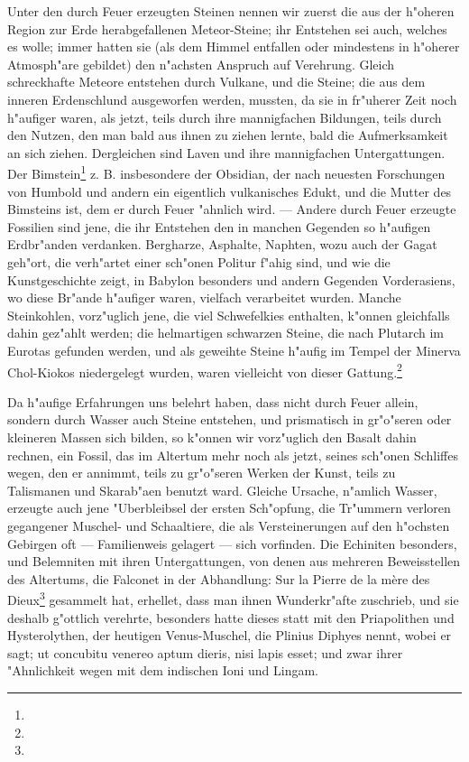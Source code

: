 \documentclass[a4paper, 11pt, oneside, polutonikogreek, german]{article}
\begin{document}
Unter den durch Feuer erzeugten Steinen nennen wir zuerst die aus der h"oheren Region zur Erde herabgefallenen Meteor-Steine; ihr Entstehen sei auch, welches es wolle; immer hatten sie (als dem Himmel entfallen oder mindestens in h"oherer Atmosph"are gebildet) den n"achsten Anspruch auf Verehrung. Gleich schreckhafte Meteore entstehen durch Vulkane, und die Steine; die aus dem inneren Erdenschlund ausgeworfen werden, mussten, da sie in fr"uherer Zeit noch h"aufiger waren, als jetzt, teils durch ihre mannigfachen Bildungen, teils durch den Nutzen, den man bald aus ihnen zu ziehen lernte, bald die Aufmerksamkeit an sich ziehen. Dergleichen sind Laven und ihre mannigfachen Untergattungen. Der Bimstein\footnote{} z. B. insbesondere der Obsidian, der nach neuesten Forschungen von Humbold und andern ein eigentlich vulkanisches Edukt, und die Mutter des Bimsteins ist, dem er durch Feuer "ahnlich wird. --- Andere durch Feuer erzeugte Fossilien sind jene, die ihr Entstehen den in manchen Gegenden so h"aufigen Erdbr"anden verdanken. Bergharze, Asphalte, Naphten, wozu auch der Gagat geh"ort, die verh"artet einer sch"onen Politur f"ahig sind, und wie die Kunstgeschichte zeigt, in Babylon besonders und andern Gegenden Vorderasiens, wo diese Br"ande h"aufiger waren, vielfach verarbeitet wurden. Manche Steinkohlen, vorz"uglich jene, die viel Schwefelkies enthalten, k"onnen gleichfalls dahin gez"ahlt werden; die helmartigen schwarzen Steine, die nach Plutarch im Eurotas gefunden werden, und als geweihte Steine h"aufig im Tempel der Minerva Chol-Kiokos niedergelegt wurden, waren vielleicht von dieser Gattung.\footnote{}

Da h"aufige Erfahrungen uns belehrt haben, dass nicht durch Feuer allein, sondern durch Wasser auch Steine entstehen, und prismatisch in gr"o"seren oder kleineren Massen sich bilden, so k"onnen wir vorz"uglich den Basalt dahin rechnen, ein Fossil, das im Altertum mehr noch als jetzt, seines sch"onen Schliffes wegen, den er annimmt, teils zu gr"o"seren Werken der Kunst, teils zu Talismanen und Skarab"aen benutzt ward. Gleiche Ursache, n"amlich Wasser, erzeugte auch jene "Uberbleibsel der ersten Sch"opfung, die Tr"ummern verloren gegangener Muschel- und Schaaltiere, die als Versteinerungen auf den h"ochsten Gebirgen oft --- Familienweis gelagert --- sich vorfinden. Die Echiniten besonders, und Belemniten mit ihren Untergattungen, von denen aus mehreren Beweisstellen des Altertums, die Falconet in der Abhandlung: Sur la Pierre de la mère des Dieux\footnote{} gesammelt hat, erhellet, dass man ihnen Wunderkr"afte zuschrieb, und sie deshalb g"ottlich verehrte, besonders hatte dieses statt mit den Priapolithen und Hysterolythen, der heutigen Venus-Muschel, die Plinius Diphyes nennt, wobei er sagt; ut concubitu venereo aptum dieris, nisi lapis esset; und zwar ihrer "Ahnlichkeit wegen mit dem indischen Ioni und Lingam.
\end{document}
